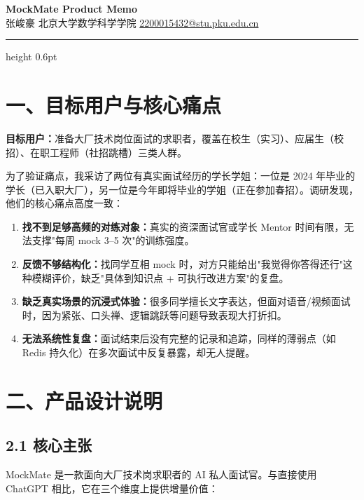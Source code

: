 \documentclass[11pt]{article}
\begin{document}

\begin{center}
    {\LARGE \heiti \textbf{\color{CVBlue}MockMate Product Memo}} \\[0.6em]
    {\normalsize 张峻豪 \quad 北京大学数学科学学院 \quad \href{mailto:2200015432@stu.pku.edu.cn}{2200015432@stu.pku.edu.cn}}
\end{center}

\vspace{0.2em}
{\color{CVBlue}\hrule height 0.6pt}
\vspace{1.0em}

\section*{一、目标用户与核心痛点}

\textbf{目标用户：}准备大厂技术岗位面试的求职者，覆盖在校生（实习）、应届生（校招）、在职工程师（社招跳槽）三类人群。

为了验证痛点，我采访了两位有真实面试经历的学长学姐：一位是 2024 年毕业的学长（已入职大厂），另一位是今年即将毕业的学姐（正在参加春招）。调研发现，他们的核心痛点高度一致：

\begin{enumerate}
    \item \textbf{找不到足够高频的对练对象：}真实的资深面试官或学长 Mentor 时间有限，无法支撑"每周 mock 3--5 次"的训练强度。
    \item \textbf{反馈不够结构化：}找同学互相 mock 时，对方只能给出"我觉得你答得还行"这种模糊评价，缺乏"具体到知识点 + 可执行改进方案"的复盘。
    \item \textbf{缺乏真实场景的沉浸式体验：}很多同学擅长文字表达，但面对语音/视频面试时，因为紧张、口头禅、逻辑跳跃等问题导致表现大打折扣。
    \item \textbf{无法系统性复盘：}面试结束后没有完整的记录和追踪，同样的薄弱点（如 Redis 持久化）在多次面试中反复暴露，却无人提醒。
\end{enumerate}

\section*{二、产品设计说明}

\subsection*{2.1 核心主张}

MockMate 是一款面向大厂技术岗求职者的 AI 私人面试官。与直接使用 ChatGPT 相比，它在三个维度上提供增量价值：
\end{document}
